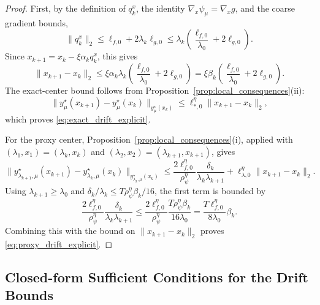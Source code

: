 \documentclass{article}
\begin{document}
\begin{proof}
First, by the definition of \(q_k^x\), the identity \(\nabla_x\psi_\mu=\nabla_x g\), and the coarse
gradient bounds,
\[
\|q_k^x\|_2
\le
\ell_{f,0}+2\lambda_k\ell_{g,0}
\le
\lambda_k
\left(\frac{\ell_{f,0}}{\lambda_0}+2\ell_{g,0}\right).
\]
Since \(x_{k+1}=x_k-\xi\alpha_k q_k^x\), this gives
\[
\|x_{k+1}-x_k\|_2
\le
\xi\alpha_k\lambda_k
\left(\frac{\ell_{f,0}}{\lambda_0}+2\ell_{g,0}\right)
=
\xi\beta_k
\left(\frac{\ell_{f,0}}{\lambda_0}+2\ell_{g,0}\right).
\]
The exact-center bound follows from Proposition~\ref{prop:local_consequences}(ii):
\[
\|y_\mu^\star(x_{k+1})-y_\mu^\star(x_k)\|_{y_\mu^\star(x_k)}
\le
\ell_{*,0}^{\eta}\|x_{k+1}-x_k\|_2,
\]
which proves \eqref{eq:exact_drift_explicit}.

For the proxy center, Proposition~\ref{prop:local_consequences}(i), applied with
\((\lambda_1,x_1)=(\lambda_k,x_k)\) and
\((\lambda_2,x_2)=(\lambda_{k+1},x_{k+1})\), gives
\[
\|y_{\lambda_{k+1},\mu}^\star(x_{k+1})
-y_{\lambda_k,\mu}^\star(x_k)\|_{y_{\lambda_k,\mu}^\star(x_k)}
\le
\frac{2\ell_{f,0}^{\eta}}{\rho_\psi^\eta}
\frac{\delta_k}{\lambda_k\lambda_{k+1}}
+
\ell_{\lambda,0}^{\eta}\|x_{k+1}-x_k\|_2 .
\]
Using \(\lambda_{k+1}\ge\lambda_0\) and
\(\delta_k/\lambda_k\le T\rho_\psi^\eta\beta_k/16\), the first term is bounded by
\[
\frac{2\ell_{f,0}^{\eta}}{\rho_\psi^\eta}
\frac{\delta_k}{\lambda_k\lambda_{k+1}}
\le
\frac{2\ell_{f,0}^{\eta}}{\rho_\psi^\eta}
\frac{T\rho_\psi^\eta\beta_k}{16\lambda_0}
=
\frac{T\ell_{f,0}^{\eta}}{8\lambda_0}\beta_k .
\]
Combining this with the bound on \(\|x_{k+1}-x_k\|_2\) proves
\eqref{eq:proxy_drift_explicit}.
\end{proof}

\subsection{Closed-form Sufficient Conditions for the Drift Bounds}
\end{document}
